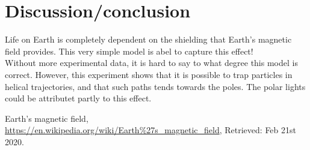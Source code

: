 \documentclass[a4paper, 12pt]{article}
\begin{document}
\section{Discussion/conclusion}
Life on Earth is completely dependent on the shielding that Earth's magnetic field provides.\cite{wiki-mag}
This very simple model is abel to capture this effect!\\

Without more experimental data, it is hard to say to what degree this model is correct.
However, this experiment shows that it is possible to trap particles in helical trajectories, and that such paths tends towards the poles. The polar lights could be attributet partly to this effect.

\begin{thebibliography}{9}
  Earth's magnetic field,
  \url{https://en.wikipedia.org/wiki/Earth\%27s_magnetic_field},
  Retrieved: Feb 21st 2020.
\end{thebibliography}
\end{document}
